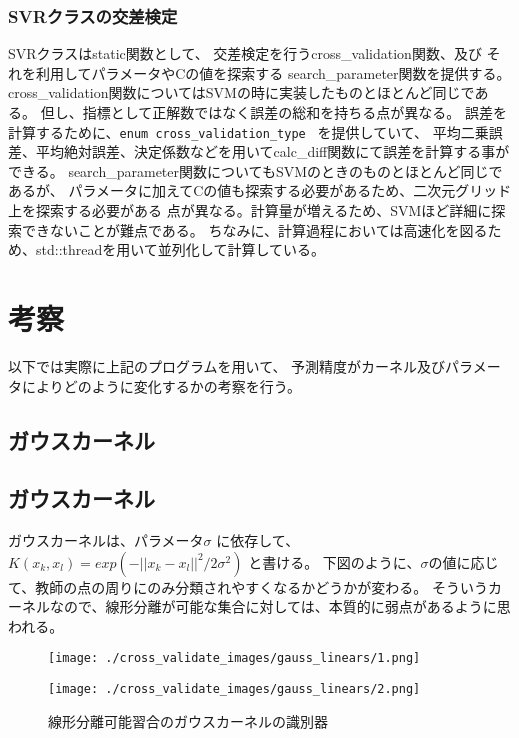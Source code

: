 \documentclass[]{jsarticle}
\begin{document}
\subsubsection{SVRクラスの交差検定}
SVRクラスはstatic関数として、
交差検定を行うcross\_validation関数、及び
それを利用してパラメータやCの値を探索する search\_parameter関数を提供する。
cross\_validation関数についてはSVMの時に実装したものとほとんど同じである。
但し、指標として正解数ではなく誤差の総和を持ちる点が異なる。
誤差を計算するために、\verb|enum cross_validation_type | を提供していて、
平均二乗誤差、平均絶対誤差、決定係数などを用いてcalc\_diff関数にて誤差を計算する事ができる。
search\_parameter関数についてもSVMのときのものとほとんど同じであるが、
パラメータに加えてCの値も探索する必要があるため、二次元グリッド上を探索する必要がある
点が異なる。計算量が増えるため、SVMほど詳細に探索できないことが難点である。
ちなみに、計算過程においては高速化を図るため、std::threadを用いて並列化して計算している。

\newpage
\section{考察}
以下では実際に上記のプログラムを用いて、
予測精度がカーネル及びパラメータによりどのように変化するかの考察を行う。
\subsection{ガウスカーネル}
%
%

\subsection{ガウスカーネル}
ガウスカーネルは、パラメータ$\sigma$ に依存して、
$K(x_k,x_l) = exp(-||x_k-x_l||^2 / 2\sigma^2) $ と書ける。
下図のように、$\sigma$の値に応じて、教師の点の周りにのみ分類されやすくなるかどうかが変わる。
そういうカーネルなので、線形分離が可能な集合に対しては、本質的に弱点があるように思われる。

\begin{figure}[htbp]
 \begin{minipage}[b]{0.5\hsize}
  \texttt{[image: ./cross\_validate\_images/gauss\_linears/1.png]}
 \end{minipage}
 \begin{minipage}[b]{0.5\hsize}
  \texttt{[image: ./cross\_validate\_images/gauss\_linears/2.png]}
 \end{minipage}
 \caption{線形分離可能習合のガウスカーネルの識別器}
\end{figure}
\end{document}
